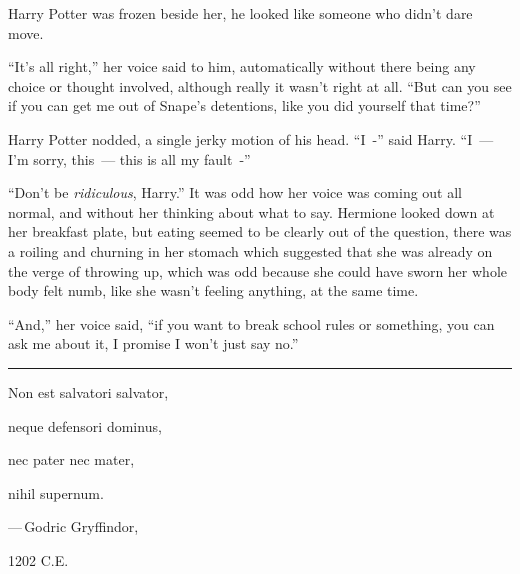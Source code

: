 Harry Potter was frozen beside her, he looked like someone who didn't dare move.

``It's all right,'' her voice said to him, automatically without there being any choice or thought involved, although really it wasn't right at all. ``But can you see if you can get me out of Snape's detentions, like you did yourself that time?''

Harry Potter nodded, a single jerky motion of his head. ``I~-'' said Harry. ``I~--- I'm sorry, this~--- this is all my fault~-''

``Don't be \emph{ridiculous}, Harry.'' It was odd how her voice was coming out all normal, and without her thinking about what to say. Hermione looked down at her breakfast plate, but eating seemed to be clearly out of the question, there was a roiling and churning in her stomach which suggested that she was already on the verge of throwing up, which was odd because she could have sworn her whole body felt numb, like she wasn't feeling anything, at the same time.

``And,'' her voice said, ``if you want to break school rules or something, you can ask me about it, I promise I won't just say no.''

\begin{center}\rule{3in}{0.4pt}\end{center}

Non est salvatori salvator,

neque defensori dominus,

nec pater nec mater,

nihil supernum.

---\,Godric Gryffindor,

1202 C.E.
